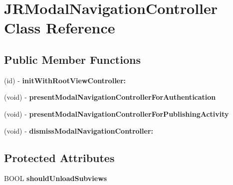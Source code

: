 \hypertarget{interface_j_r_modal_navigation_controller}{
\section{JRModalNavigationController Class Reference}
\label{interface_j_r_modal_navigation_controller}
}
\subsection*{Public Member Functions}
\begin{DoxyCompactItemize}
\item 
\hypertarget{interface_j_r_modal_navigation_controller_a9232dd6a4f8a52dd9914510332a14787}{
(id) -\/ {\bfseries initWithRootViewController:}}
\label{interface_j_r_modal_navigation_controller_a9232dd6a4f8a52dd9914510332a14787}

\item 
\hypertarget{interface_j_r_modal_navigation_controller_adb4d443e12fc472caad98b34bcddb84c}{
(void) -\/ {\bfseries presentModalNavigationControllerForAuthentication}}
\label{interface_j_r_modal_navigation_controller_adb4d443e12fc472caad98b34bcddb84c}

\item 
\hypertarget{interface_j_r_modal_navigation_controller_aa09df32fe944f2ccfa022ac3b94de395}{
(void) -\/ {\bfseries presentModalNavigationControllerForPublishingActivity}}
\label{interface_j_r_modal_navigation_controller_aa09df32fe944f2ccfa022ac3b94de395}

\item 
\hypertarget{interface_j_r_modal_navigation_controller_aa73377b50292399cbebca59296d881bf}{
(void) -\/ {\bfseries dismissModalNavigationController:}}
\label{interface_j_r_modal_navigation_controller_aa73377b50292399cbebca59296d881bf}

\end{DoxyCompactItemize}
\subsection*{Protected Attributes}
\begin{DoxyCompactItemize}
\item 
\hypertarget{interface_j_r_modal_navigation_controller_ad630ca91643d94b165178d134ac404c3}{
BOOL {\bfseries shouldUnloadSubviews}}
\label{interface_j_r_modal_navigation_controller_ad630ca91643d94b165178d134ac404c3}

\end{DoxyCompactItemize}
